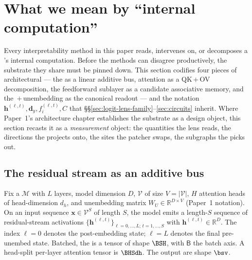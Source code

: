 
\section{What we mean by ``internal computation''}
\label{sec:substrate}

Every interpretability method in this paper reads, intervenes on, or
decomposes a 's internal computation. Before the methods can
disagree productively, the substrate they share must be pinned down.
This section codifies four pieces of architectural  --- the
 as a linear additive bus, attention as a
QK\,$+$\,OV decomposition, the feedforward sublayer as a candidate
associative memory, and the \,$+$\,unembedding as the canonical
readout --- and the notation
$\mathbf{h}^{(\ell,t)}, \mathbf{d}_y, f_i^{(\ell,t)}, C$ that
\S\S\ref{sec:logit-lens-family}--\ref{sec:circuits} inherit. Where
Paper~1's architecture chapter establishes the substrate as a design
object, this section recasts it as a \emph{measurement} object: the
quantities the lens reads, the directions the  projects onto, the
sites the patcher swaps, the subgraphs the  picks out.

\subsection{The residual stream as an additive bus}
\label{sec:substrate-residual}

Fix a   $\mathcal{M}$ with $L$ layers, model
dimension $D$,  $\mathcal{V}$ of size $V = |\mathcal{V}|$,
$H$ attention heads of head-dimension $d_h$, and unembedding matrix
$W_U \in \mathbb{R}^{D \times V}$ (Paper~1 notation). On an input
sequence $\mathbf{x} \in \mathcal{V}^S$ of length $S$, the model emits
a length-$S$ sequence of residual-stream activations
$\{\mathbf{h}^{(\ell, t)}\}_{\ell=0,\dots,L;\, t=1,\dots,S}$ with
$\mathbf{h}^{(\ell, t)} \in \mathbb{R}^D$. The index $\ell = 0$ denotes
the post-embedding state; $\ell = L$ denotes the final pre-unembed
state. Batched, the  is a tensor of shape $\BSH$, with
$\mathsf{B}$ the batch axis. A head-split per-layer attention tensor is
$\BHSdh$. The output  are shape $\bsv$.

